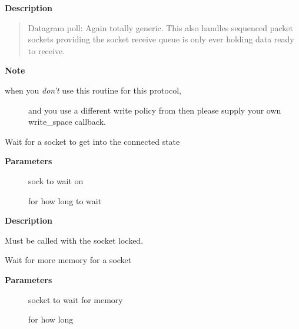 \documentclass[a4paper,8pt,english]{sphinxmanual}
\begin{document}
\textbf{Description}
\begin{quote}

Datagram poll: Again totally generic. This also handles
sequenced packet sockets providing the socket receive queue
is only ever holding data ready to receive.
\end{quote}

\textbf{Note}
\begin{description}
\item[{when you \emph{don't} use this routine for this protocol,}] \leavevmode
and you use a different write policy from 
then please supply your own write\_space callback.

\end{description}

\begin{fulllineitems}
\label{networking/kapi:c.sk_stream_wait_connect}
Wait for a socket to get into the connected state

\end{fulllineitems}


\textbf{Parameters}
\begin{description}
\item[{}] \leavevmode
sock to wait on

\item[{}] \leavevmode
for how long to wait

\end{description}

\textbf{Description}

Must be called with the socket locked.

\begin{fulllineitems}
\label{networking/kapi:c.sk_stream_wait_memory}
Wait for more memory for a socket

\end{fulllineitems}


\textbf{Parameters}
\begin{description}
\item[{}] \leavevmode
socket to wait for memory

\item[{}] \leavevmode
for how long

\end{description}
\end{document}
